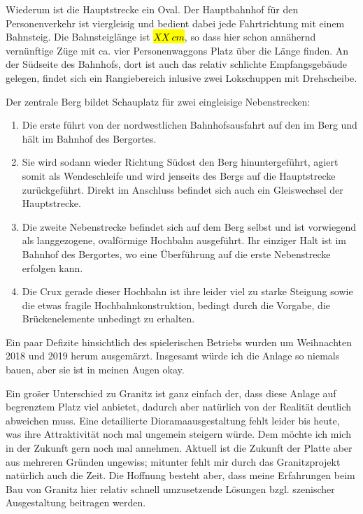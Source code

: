 Wiederum ist die Hauptstrecke ein Oval.
Der Hauptbahnhof f\"ur den Personenverkehr ist viergleisig und bedient dabei jede Fahrtrichtung mit einem Bahnsteig.
Die Bahnsteigl\"ange ist \hl{$XX~cm$}, so dass hier schon ann\"ahernd vern\"unftige Z\"uge mit ca. vier Personenwaggons Platz \"uber die L\"ange finden.
An der S\"udseite des Bahnhofs, dort ist auch das relativ schlichte Empfangsgeb\"aude gelegen, findet sich ein Rangiebereich inlusive zwei Lokschuppen mit Drehscheibe.

Der zentrale Berg bildet Schauplatz f\"ur zwei eingleisige Nebenstrecken:
\begin{enumerate}
	\item Die erste f\"uhrt von der nordwestlichen Bahnhofsausfahrt auf den im Berg und h\"alt im Bahnhof des Bergortes.
	\item Sie wird sodann wieder Richtung S\"udost den Berg hinuntergef\"uhrt, agiert somit als Wendeschleife und wird jenseits des Bergs auf die Hauptstrecke zur\"uckgef\"uhrt.
	Direkt im Anschluss befindet sich auch ein Gleiswechsel der Hauptstrecke.
	\item Die zweite Nebenstrecke befindet sich auf dem Berg selbst und ist vorwiegend als langgezogene, ovalf\"ormige Hochbahn ausgef\"uhrt.
	Ihr einziger Halt ist im Bahnhof des Bergortes, wo eine \"Uberf\"uhrung auf die erste Nebenstrecke erfolgen kann.
	\item Die Crux gerade dieser Hochbahn ist ihre leider viel zu starke Steigung sowie die etwas fragile Hochbahnkonstruktion, bedingt durch die Vorgabe, die Br\"uckenelemente unbedingt zu erhalten.
\end{enumerate}

Ein paar Defizite hinsichtlich des spielerischen Betriebs wurden um Weihnachten 2018 und 2019 herum ausgem\"arzt.
Insgesamt w\"urde ich die Anlage so niemals bauen, aber sie ist in meinen Augen okay.

Ein gro\"ser Unterschied zu Granitz ist ganz einfach der, dass diese Anlage auf begrenztem Platz viel anbietet, dadurch aber nat\"urlich von der Realit\"at deutlich abweichen muss.
Eine detaillierte Dioramaausgestaltung fehlt leider bis heute, was ihre Attraktivit\"at noch mal ungemein steigern w\"urde.
Dem m\"ochte ich mich in der Zukunft gern noch mal annehmen.
Aktuell ist die Zukunft der Platte aber aus mehreren Gr\"unden ungewiss; mitunter fehlt mir durch das Granitzprojekt nat\"urlich auch die Zeit.
Die Hoffnung besteht aber, dass meine Erfahrungen beim Bau von Granitz hier relativ schnell umzusetzende L\"osungen bzgl. szenischer Ausgestaltung beitragen werden.

